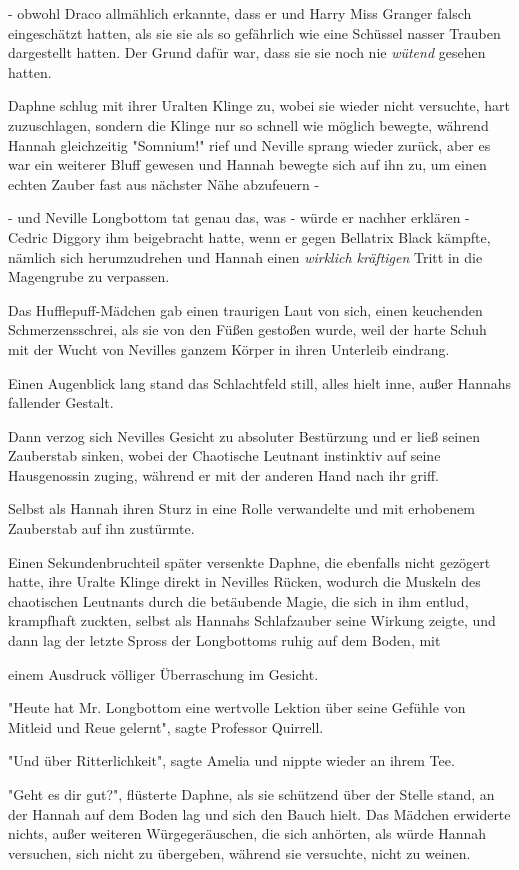 {- obwohl Draco allmählich erkannte, dass er und Harry Miss Granger falsch eingeschätzt hatten, als sie sie als so gefährlich wie eine Schüssel nasser Trauben dargestellt hatten. Der Grund dafür war, dass sie sie noch nie \emph{wütend} gesehen hatten.

Daphne schlug mit ihrer Uralten Klinge zu, wobei sie wieder nicht versuchte, hart zuzuschlagen, sondern die Klinge nur so schnell wie möglich bewegte, während Hannah gleichzeitig "Somnium!" rief und Neville sprang wieder zurück, aber es war ein weiterer Bluff gewesen und Hannah bewegte sich auf ihn zu, um einen echten Zauber fast aus nächster Nähe abzufeuern -

- und Neville Longbottom tat genau das, was - würde er nachher erklären - Cedric Diggory ihm beigebracht hatte, wenn er gegen Bellatrix Black kämpfte, nämlich sich herumzudrehen und Hannah einen \emph{wirklich kräftigen} Tritt in die Magengrube zu verpassen.

Das Hufflepuff-Mädchen gab einen traurigen Laut von sich, einen keuchenden Schmerzensschrei, als sie von den Füßen gestoßen wurde, weil der harte Schuh mit der Wucht von Nevilles ganzem Körper in ihren Unterleib eindrang.

Einen Augenblick lang stand das Schlachtfeld still, alles hielt inne, außer Hannahs fallender Gestalt.

Dann verzog sich Nevilles Gesicht zu absoluter Bestürzung und er ließ seinen Zauberstab sinken, wobei der Chaotische Leutnant instinktiv auf seine Hausgenossin zuging, während er mit der anderen Hand nach ihr griff.

Selbst als Hannah ihren Sturz in eine Rolle verwandelte und mit erhobenem Zauberstab auf ihn zustürmte.

Einen Sekundenbruchteil später versenkte Daphne, die ebenfalls nicht gezögert hatte, ihre Uralte Klinge direkt in Nevilles Rücken, wodurch die Muskeln des chaotischen Leutnants durch die betäubende Magie, die sich in ihm entlud, krampfhaft zuckten, selbst als Hannahs Schlafzauber seine Wirkung zeigte, und dann lag der letzte Spross der Longbottoms ruhig auf dem Boden, mit

einem Ausdruck völliger Überraschung im Gesicht.

"Heute hat Mr. Longbottom eine wertvolle Lektion über seine Gefühle von Mitleid und Reue gelernt", sagte Professor Quirrell.

"Und über Ritterlichkeit", sagte Amelia und nippte wieder an ihrem Tee.

"Geht es dir gut?", flüsterte Daphne, als sie schützend über der Stelle stand, an der Hannah auf dem Boden lag und sich den Bauch hielt. Das Mädchen erwiderte nichts, außer weiteren Würgegeräuschen, die sich anhörten, als würde Hannah versuchen, sich nicht zu übergeben, während sie versuchte, nicht zu weinen.

}
